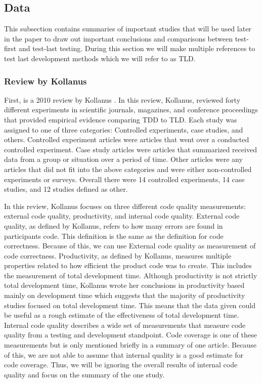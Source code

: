 \documentclass{sig-alternate}
\begin{document}
\subsection{Data}

This subsection contains summaries of important studies that will be used later in the paper to draw out important conclusions and comparisons between test-first and test-last testing.  During this section we will make multiple references to test last development methods which we will refer to as TLD.

\subsubsection{Review by Kollanus}

First, is a 2010 review by Kollanus \cite{Kollanus:2010}.  In this review, Kollanus,  reviewed forty different experiments in scientific journals, magazines, and conference proceedings that provided empirical evidence comparing TDD  to TLD.  Each study was assigned to one of three categories: Controlled experiments, case studies, and others.  Controlled experiment articles were articles that went over a conducted controlled experiment.  Case study articles were articles that summarized received data from a group or situation over a period of time.  Other articles were any articles that did not fit into the above categories and were either non-controlled experiments or surveys.  Overall there were 14 controlled experiments, 14 case studies, and 12 studies defined as other.  


In this review, Kollanus focuses on three different code quality measurements: external code quality, productivity, and internal code quality.  External code quality, as defined by Kollanus, refers to how many errors are found in participants code.  This definition is the same as the definition for code correctness.  Because of this, we can use External code quality as measurement of code correctness.  Productivity, as defined by Kollanus, measures multiple properties related to how efficient the product code was to create.  This includes the measurement of total development time.  Although productivity is not strictly total development time, Kollanus wrote her conclusions in productivity based mainly on development time which suggests that the majority of productivity studies focused on total development time.  This means that the data given could be useful as a rough estimate of the effectiveness of total development time.
Internal code quality describes a wide set of measurements that measure code quality from a testing and development standpoint.  Code coverage is one of these measurements but is only mentioned briefly in a summary of one article.  Because of this, we are not able to assume that internal quality is a good estimate for code coverage.  Thus, we will be ignoring the overall results of internal code quality and focus on the summary of the one study.
\end{document}
